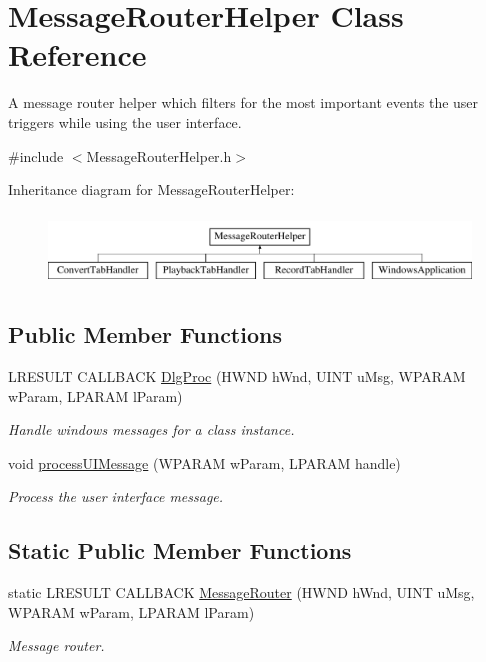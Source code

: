 \hypertarget{class_message_router_helper}{}\section{Message\+Router\+Helper Class Reference}
\label{class_message_router_helper}


A message router helper which filters for the most important events the user triggers while using the user interface.  




{\ttfamily \#include $<$Message\+Router\+Helper.\+h$>$}

Inheritance diagram for Message\+Router\+Helper\+:\begin{figure}[H]
\begin{center}
\leavevmode
\includegraphics[height=1.917808cm]{class_message_router_helper}
\end{center}
\end{figure}
\subsection*{Public Member Functions}
\begin{DoxyCompactItemize}
\item 
L\+R\+E\+S\+U\+L\+T C\+A\+L\+L\+B\+A\+C\+K \hyperlink{class_message_router_helper_aaac37caa0b5c4d76e3fbafdeca74c6e0}{Dlg\+Proc} (H\+W\+N\+D h\+Wnd, U\+I\+N\+T u\+Msg, W\+P\+A\+R\+A\+M w\+Param, L\+P\+A\+R\+A\+M l\+Param)
\begin{DoxyCompactList}\small\item\em Handle windows messages for a class instance. \end{DoxyCompactList}\item 
void \hyperlink{class_message_router_helper_ac88e1ed7b137f8196c0f524fb8c5464d}{process\+U\+I\+Message} (W\+P\+A\+R\+A\+M w\+Param, L\+P\+A\+R\+A\+M handle)
\begin{DoxyCompactList}\small\item\em Process the user interface message. \end{DoxyCompactList}\end{DoxyCompactItemize}
\subsection*{Static Public Member Functions}
\begin{DoxyCompactItemize}
\item 
static L\+R\+E\+S\+U\+L\+T C\+A\+L\+L\+B\+A\+C\+K \hyperlink{class_message_router_helper_abd2ea3c59170fe99e37193ccfd5d99ee}{Message\+Router} (H\+W\+N\+D h\+Wnd, U\+I\+N\+T u\+Msg, W\+P\+A\+R\+A\+M w\+Param, L\+P\+A\+R\+A\+M l\+Param)
\begin{DoxyCompactList}\small\item\em Message router. \end{DoxyCompactList}\end{DoxyCompactItemize}
